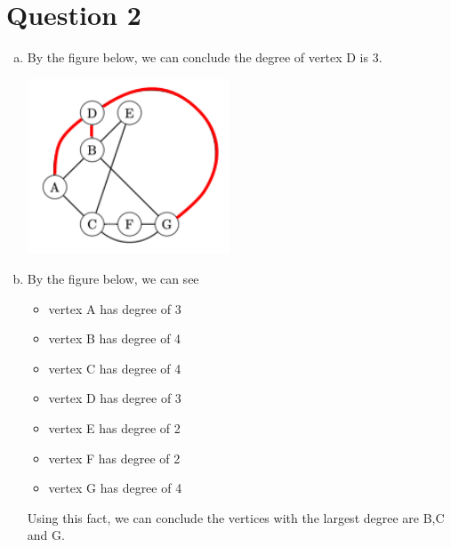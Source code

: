 \documentclass[12pt]{article}
\begin{document}
\begin{enumerate}[a.]
\end{enumerate}

\section*{Question 2}
\begin{enumerate}[a.]
    \item By the figure below, we can conclude the degree of vertex D is 3.

    \begin{center}
    \includegraphics[width=6cm]{images/worksheet_19_q2a_solution.png}
    \end{center}

    \item By the figure below, we can see

    \begin{itemize}
        \item vertex A has degree of 3
        \item vertex B has degree of 4
        \item vertex C has degree of 4
        \item vertex D has degree of 3
        \item vertex E has degree of 2
        \item vertex F has degree of 2
        \item vertex G has degree of 4
    \end{itemize}

    \bigskip

    Using this fact, we can conclude the vertices with the largest degree are
    B,C and G.


\end{enumerate}
\end{document}
